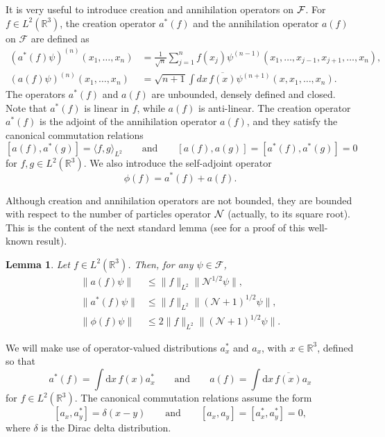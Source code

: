 \documentclass[11pt,a4paper]{article}
\newtheorem{lem}[thm]{Lemma}
\newcommand{\cF}{{\cal F}}
\newcommand{\cN}{{\cal N}}
\newcommand{\R}{\mathbb{R}}
\newcommand{\N}{\mathcal{N}}
\newcommand{\di}{\textrm{d}}		%
\newcommand{\Ncal}{\mathcal{N}}		%
\newcommand{\cc}[1]{\overline{#1}}	%
\newcommand{\norm}[1]{\lVert#1\rVert}	%
\begin{document}
It is very useful to introduce creation and annihilation operators on $\cF$. 
For $f \in L^2(\R^3)$, the creation operator $a^*(f)$ and the annihilation
operator $a(f)$ on $\mathcal{F}$ are defined as
\[
  \begin{split}
    (a^*(f) \psi)^{(n)}(x_1, \dots, x_n) & = \frac{1}{\sqrt{n}} \sum_{j=1}^n
    f(x_j) \psi^{(n-1)}(x_1, \dots, x_{j-1}, x_{j+1}, \dots, x_n), \\
    (a(f) \psi)^{(n)}(x_1, \dots, x_n) & = \sqrt{n+1} \int dx \,
    \overline{f(x)} \psi^{(n+1)}(x, x_1, \dots, x_n).
  \end{split}
\]
The operators $a^*(f)$ and $a(f)$ are unbounded, densely defined and closed.
Note that $a^*(f)$ is linear in $f$, while $a(f)$ is anti-linear. The creation
operator $a^*(f)$ is the adjoint of the annihilation operator $a(f)$, and
they satisfy the canonical commutation relations
\begin{equation}\label{eq:ccr}
  [a(f), a^*(g)] = \langle f, g \rangle_{L^2} \qquad \text{and} \qquad [a(f),
  a(g)] = [a^*(f), a^*(g)] = 0
\end{equation}
for $f,g \in L^2(\R^3)$. We also introduce the self-adjoint operator
\[
  \phi(f) = a^*(f) + a(f).
\]

Although creation and annihilation operators are not bounded, they are bounded with respect to the number of particles operator $\cN$ (actually, to its square root). This is the content of the next standard lemma (see \cite{RS} for a proof of this well-known result).
\begin{lem} \label{l:a}
  Let $f \in L^2(\R^3)$. Then, for any $\psi \in
  \mathcal{F}$,
  \begin{equation} \label{aNorm}
    \begin{aligned}
      \norm{a(f)\psi} & \leq \norm{f}_{L^2} \norm{\Ncal^{1/2}\psi}, \\
      \norm{a^*(f)\psi} & \leq \norm{f}_{L^2} \norm{(\Ncal+1)^{1/2}\psi}, \\
      \norm{\phi(f) \psi} & \leq 2 \norm{f}_{L^2} \norm{(\N+1)^{1/2} \psi}.
    \end{aligned}
  \end{equation}
\end{lem}


We will make use of operator-valued distributions $a_x^*$ and $a_x$, with $x
\in \R^3$, defined so that
\[
  a^*(f) = \int \di x\, f(x) a^*_x \qquad \text{and} \qquad a(f) = \int \di
  x\, \cc{f(x)} a_x
\]
for $f \in L^2(\R^3)$. The canonical commutation
relations assume the form
\[
  [a_x, a_y^*] = \delta(x-y) \qquad \text{and} \qquad [a_x, a_y] = [a_x^*,
  a_y^*] = 0,
\]
where $\delta$ is the Dirac delta distribution.
\end{document}
